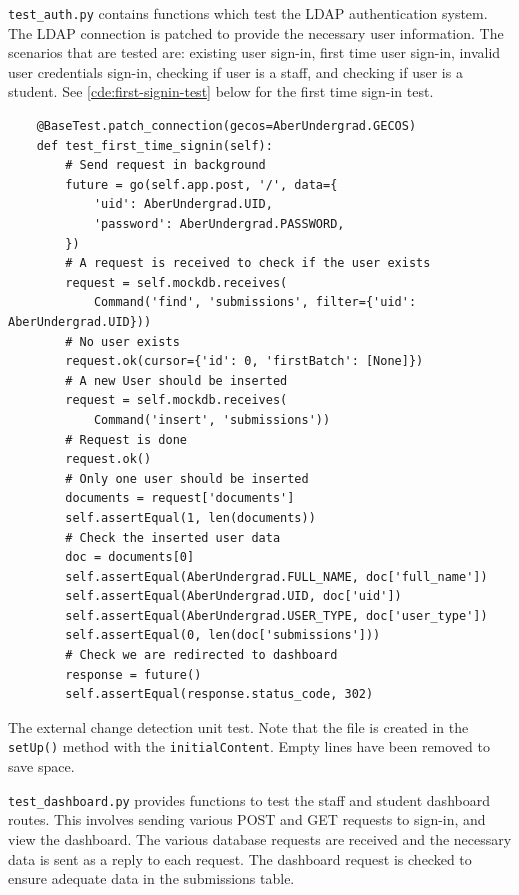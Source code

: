 \texttt{test\_auth.py} contains functions which test the LDAP authentication system. The LDAP connection is patched to provide the necessary user information. The scenarios that are tested are: existing user sign-in, first time user sign-in, invalid user credentials sign-in, checking if user is a staff, and checking if user is a student. See \autoref{cde:first-signin-test} below for the first time sign-in test.

\begin{code}
\begin{verbatim}
    @BaseTest.patch_connection(gecos=AberUndergrad.GECOS)
    def test_first_time_signin(self):
        # Send request in background
        future = go(self.app.post, '/', data={
            'uid': AberUndergrad.UID,
            'password': AberUndergrad.PASSWORD,
        })
        # A request is received to check if the user exists
        request = self.mockdb.receives(
            Command('find', 'submissions', filter={'uid': AberUndergrad.UID}))
        # No user exists
        request.ok(cursor={'id': 0, 'firstBatch': [None]})
        # A new User should be inserted
        request = self.mockdb.receives(
            Command('insert', 'submissions'))
        # Request is done
        request.ok()
        # Only one user should be inserted
        documents = request['documents']
        self.assertEqual(1, len(documents))
        # Check the inserted user data
        doc = documents[0]
        self.assertEqual(AberUndergrad.FULL_NAME, doc['full_name'])
        self.assertEqual(AberUndergrad.UID, doc['uid'])
        self.assertEqual(AberUndergrad.USER_TYPE, doc['user_type'])
        self.assertEqual(0, len(doc['submissions']))
        # Check we are redirected to dashboard
        response = future()
        self.assertEqual(response.status_code, 302)
\end{verbatim}
\caption[Authentication test]{The external change detection unit test. Note that the file is created in the \texttt{setUp()} method with the \texttt{initialContent}. Empty lines have been removed to save space.}
\label{cde:first-signin-test}
\end{code}

\texttt{test\_dashboard.py} provides functions to test the staff and student dashboard routes. This involves sending various POST and GET requests to sign-in, and view the dashboard. The various database requests are received and the necessary data is sent as a reply to each request. The dashboard request is checked to ensure adequate data in the submissions table.

